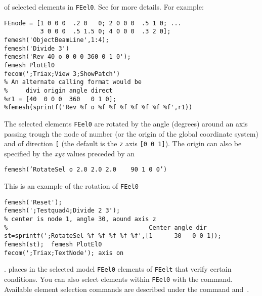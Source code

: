 
 of selected elements in {\tt FEel0}. See  for more details.
For example:

\begin{verbatim}
FEnode = [1 0 0 0  .2 0   0; 2 0 0 0  .5 1 0; ...  
          3 0 0 0  .5 1.5 0; 4 0 0 0  .3 2 0];
femesh('ObjectBeamLine',1:4);
femesh('Divide 3')
femesh('Rev 40 o 0 0 0 360 0 1 0');
femesh PlotEl0
fecom(';Triax;View 3;ShowPatch')
% An alternate calling format would be
%     divi origin angle direct
%r1 = [40  0 0 0  360   0 1 0];
%femesh(sprintf('Rev %f o %f %f %f %f %f %f %f',r1))
\end{verbatim}%



 The selected elements {\tt FEel0} are rotated by the angle  (degrees) around an axis passing trough the node of number  (or the origin of the global coordinate system) and of direction {\tt [}\tsi{nx ny nz}{\tt ]} (the default is the {\tt z} axis {\tt [0 0 1]}). The origin can also be specified by the {\sl xyz }values preceded by an 

{\tt femesh('RotateSel o 2.0 2.0 2.0 \ \ \  90  1 0 0')}

This is an example of the rotation of {\tt FEel0} 

\begin{verbatim}
femesh('Reset');
femesh(';Testquad4;Divide 2 3'); 
% center is node 1, angle 30, aound axis z
%                                       Center angle dir
st=sprintf(';RotateSel %f %f %f %f %f',[1      30   0 0 1]);
femesh(st);  femesh PlotEl0
fecom(';Triax;TextNode'); axis on
\end{verbatim}%



.  places in the selected model {\tt FEel0} elements of {\tt FEelt} that verify certain conditions. You can also select elements within {\tt FEel0} with the  command. Available element selection commands are described under the  command and~. 


